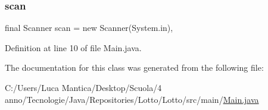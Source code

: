 \subsubsection{\texorpdfstring{scan}{scan}}
{\footnotesize\ttfamily final Scanner scan = new Scanner(System.\+in)\hspace{0.3cm}{\ttfamily [static]}, {\ttfamily [private]}}



Definition at line 10 of file Main.\+java.



The documentation for this class was generated from the following file\+:\begin{DoxyCompactItemize}
\item 
C\+:/\+Users/\+Luca Mantica/\+Desktop/\+Scuola/4 anno/\+Tecnologie/\+Java/\+Repositories/\+Lotto/\+Lotto/src/main/\mbox{\hyperlink{_main_8java}{Main.\+java}}\end{DoxyCompactItemize}
